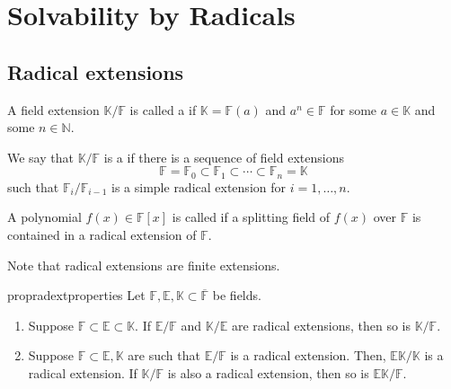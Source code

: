 \chapter{Solvability by Radicals}

\section{Radical extensions}

\begin{defn}%
	A field extension $\mathbb{K}/\mathbb{F}$ is called a  if $\mathbb{K} = \mathbb{F}(a)$ and $a^n \in \mathbb{F}$ for some $a \in \mathbb{K}$ and some $n \in \mathbb{N}.$

	We say that $\mathbb{K}/\mathbb{F}$ is a  if there is a sequence of field extensions
	\begin{equation*} 
		\mathbb{F} = \mathbb{F}_0 \subset \mathbb{F}_1 \subset \cdots \subset \mathbb{F}_n = \mathbb{K}
	\end{equation*}
	such that $\mathbb{F}_i/\mathbb{F}_{i - 1}$ is a simple radical extension for $i = 1, \ldots, n.$

	A polynomial $f(x) \in \mathbb{F}[x]$ is called  if a splitting field of $f(x)$ over $\mathbb{F}$ is contained in a radical extension of $\mathbb{F}.$
\end{defn}

\begin{rem}
	Note that radical extensions are finite extensions.
\end{rem}

\begin{restatable}[]{prop}{radextproperties}
\label{prop:radextproperties}
	Let $\mathbb{F}, \mathbb{E}, \mathbb{K} \subset \overline{\mathbb{F}}$ be fields. 
	\begin{enumerate}
		\item Suppose $\mathbb{F} \subset \mathbb{E} \subset \mathbb{K}.$ If $\mathbb{E}/\mathbb{F}$ and $\mathbb{K}/\mathbb{E}$ are radical extensions, then so is $\mathbb{K}/\mathbb{F}.$ 
		\item Suppose $\mathbb{F} \subset \mathbb{E}, \mathbb{K}$ are such that $\mathbb{E}/\mathbb{F}$ is a radical extension. Then, $\mathbb{E}\mathbb{K}/\mathbb{K}$ is a radical extension. If $\mathbb{K}/\mathbb{F}$ is also a radical extension, then so is $\mathbb{E}\mathbb{K}/\mathbb{F}.$ \hfill\hyperref[prop:radextproperties2]{\downsym}
	\end{enumerate}
\end{restatable}

